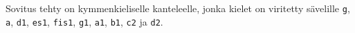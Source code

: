 \documentclass[a4paper,finnish]{article}
\begin{document}

\vspace{0.5cm}
Sovitus tehty on kymmenkieliselle kanteleelle, jonka kielet on
viritetty sävelille
\texttt{g}, \texttt{a}, \texttt{d1}, \texttt{es1}, \texttt{fis1},
\texttt{g1}, \texttt{a1}, \texttt{b1}, \texttt{c2} ja \texttt{d2}.
\end{document}
